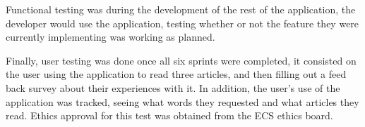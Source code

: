 Functional testing was during the development of the rest of the application, the developer would use the application, testing whether or not the feature they were currently implementing was working as planned.

Finally, user testing was done once all six sprints were completed, it consisted on the user using the application to read three articles, and then filling out a feed back survey about their experiences with it. In addition, the user's use of the application was tracked, seeing what words they requested and what articles they read. Ethics approval for this test was obtained from the ECS ethics board. 